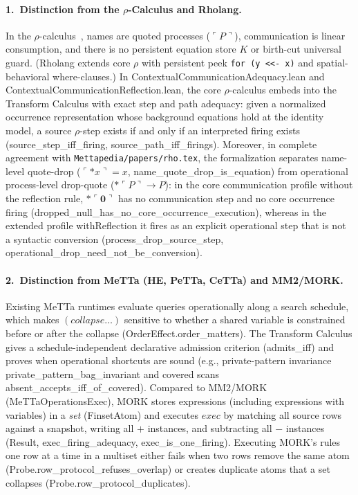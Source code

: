 \documentclass[11pt,a4paper]{article}
\theoremstyle{definition}
\DeclareRobustCommand{\lean}[1]{%
  \ifmmode\text{\normalfont\ttfamily\footnotesize\detokenize{#1}}%
  \else{\normalfont\footnotesize\leanurl{#1}}\fi}
\DeclareRobustCommand{\metta}[1]{\text{\normalfont\ttfamily\footnotesize #1}}
\def\lean#1{#1}%
\def\metta#1{#1}%
\begin{document}
\paragraph{1.\ Distinction from the $\rho$-Calculus and Rholang.}
In the $\rho$-calculus~\cite{MeredithRadestock2005Rho}, names are quoted processes ($\ulcorner P \urcorner$), communication is linear consumption, and there is no persistent equation store $K$ or birth-cut universal guard. (Rholang extends core $\rho$ with persistent peek \texttt{for (y <<- x)} and spatial-behavioral where-clauses.) In \lean{ContextualCommunicationAdequacy.lean} and \lean{ContextualCommunicationReflection.lean}, the core $\rho$-calculus embeds into the Transform Calculus with exact step and path adequacy: given a normalized occurrence representation whose background equations hold at the identity model, a source $\rho$-step exists if and only if an interpreted firing exists (\lean{source_step_iff_firing}, \lean{source_path_iff_firings}). Moreover, in complete agreement with \texttt{Mettapedia/papers/rho.tex}, the formalization separates name-level quote-drop ($\ulcorner *x \urcorner = x$, \lean{name_quote_drop_is_equation}) from operational process-level drop-quote ($*\ulcorner P \urcorner \to P$): in the core communication profile without the reflection rule, $*\ulcorner \mathbf{0} \urcorner$ has no communication step and no core occurrence firing (\lean{dropped_null_has_no_core_occurrence_execution}), whereas in the extended profile \lean{withReflection} it fires as an explicit operational step that is not a syntactic conversion (\lean{process_drop_source_step}, \lean{operational_drop_need_not_be_conversion}).

\paragraph{2.\ Distinction from MeTTa (HE, PeTTa, CeTTa) and MM2/MORK.}
Existing MeTTa runtimes evaluate queries operationally along a search schedule, which makes $\metta{(collapse }\dots\metta{)}$ sensitive to whether a shared variable is constrained before or after the collapse (\lean{OrderEffect.order_matters}). The Transform Calculus gives a schedule-independent declarative admission criterion (\lean{admits_iff}) and proves when operational shortcuts are sound (e.g., private-pattern invariance \lean{private_pattern_bag_invariant} and covered scans \lean{absent_accepts_iff_of_covered}). Compared to MM2/MORK (\lean{MeTTaOperationsExec}), MORK stores expressions (including expressions with variables) in a \emph{set} (\lean{Finset}\;\lean{Atom}) and executes $\metta{exec}$ by matching all source rows against a snapshot, writing all $+$ instances, and subtracting all $-$ instances (\lean{Result}, \lean{exec_firing_adequacy}, \lean{exec_is_one_firing}). Executing MORK's rules one row at a time in a multiset either fails when two rows remove the same atom (\lean{Probe.row_protocol_refuses_overlap}) or creates duplicate atoms that a set collapses (\lean{Probe.row_protocol_duplicates}).
\end{document}
